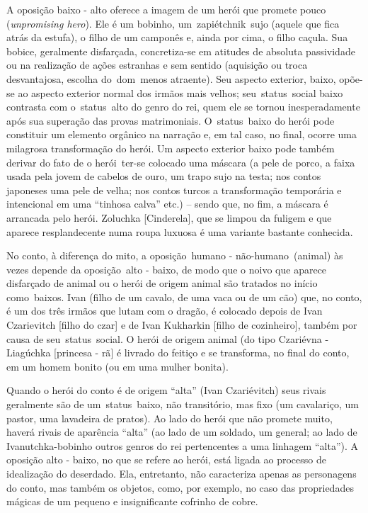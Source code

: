 A oposição baixo - alto oferece a imagem de um herói que promete pouco
(\emph{{unpromising hero}}). Ele é um bobinho, um~{zapiétchnik}~sujo
(aquele que fica atrás da estufa), o filho de um camponês e, ainda por
cima, o filho caçula. Sua bobice, geralmente disfarçada, concretiza-se
em atitudes de absoluta passividade ou na realização de ações estranhas
e sem sentido (aquisição ou troca desvantajosa, escolha do~dom~menos
atraente). Seu aspecto exterior, baixo, opõe-se ao aspecto exterior
normal dos irmãos mais velhos; seu~{status}~social baixo contrasta com
o~{status}~alto do genro do rei, quem ele se tornou inesperadamente após
sua superação das provas matrimoniais. O~{status}~baixo do herói pode
constituir um elemento orgânico na narração e, em tal caso, no final,
ocorre uma milagrosa transformação do herói. Um aspecto exterior baixo
pode também derivar do fato de o herói~ter-se colocado uma máscara (a
pele de porco, a faixa usada pela jovem de cabelos de ouro, um trapo
sujo na testa; nos contos japoneses uma pele de velha; nos contos turcos
a transformação temporária e intencional em uma ``tinhosa calva'' etc.)
-- sendo que, no fim, a máscara é arrancada pelo herói. Zoluchka
{[}Cinderela{]}, que se limpou da fuligem e que aparece resplandecente
numa roupa luxuosa é uma variante bastante conhecida.

No conto, à diferença do mito, a oposição~{humano -
não-humano}~({animal}) às vezes depende da oposição~{alto - baixo}, de
modo que o noivo que aparece disfarçado de animal ou o herói de origem
animal são tratados no início como~{baixos}. Ivan (filho de um cavalo,
de uma vaca ou de um cão) que, no conto, é um dos três irmãos que lutam
com o dragão, é colocado depois de Ivan Czarievitch {[}filho do czar{]}
e de Ivan Kukharkin {[}filho de cozinheiro{]}, também por causa de
seu~{status}~social. O herói de origem animal (do tipo Czariévna -
Liagúchka {[}princesa - rã{]} é livrado do feitiço e se transforma, no
final do conto, em um homem bonito (ou em uma mulher bonita).

Quando o herói do conto é de origem ``alta'' (Ivan Czariévitch) seus
rivais geralmente são de um~{status}~baixo, não transitório, mas fixo
(um cavalariço, um pastor, uma lavadeira de pratos). Ao lado do herói
que não promete muito, haverá rivais de aparência ``alta'' (ao lado de
um soldado, um general; ao lado de Ivanutchka-bobinho outros genros do
rei pertencentes a uma linhagem ``alta''). A oposição alto - baixo, no
que se refere ao herói, está ligada ao processo de idealização do
deserdado. Ela, entretanto, não caracteriza apenas as personagens do
conto, mas também os objetos, como, por exemplo, no caso das
propriedades mágicas de um pequeno e insignificante cofrinho de cobre.

